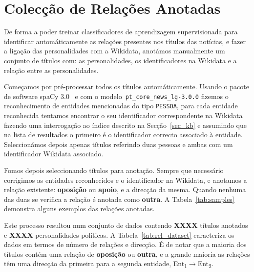 \documentclass[a4paper, twocolumn, 11pt, twoside]{article}
\begin{document}


\section{Colecção de Relações Anotadas}
\label{sec:rel_data_annot}

De forma a poder treinar classificadores de aprendizagem supervisionada para identificar automáticamente as relações presentes nos títulos das notícias, e fazer a ligação das personalidades com a Wikidata, anotámos manualmente um conjunto de títulos com: as personalidades, os identificadores na Wikidata e a relação entre as personalidades.

Começamos por pré-processar todos os títulos automáticamente. Usando o pacote de software spaCy 3.0~\citep{spacy} e com o modelo~\texttt{pt\_core\_news\_lg-3.0.0} fizemos o reconhecimento de entidades mencionadas do tipo \texttt{PESSOA}, para cada entidade reconhecida tentamos encontrar o seu identificador correspondente na Wikidata fazendo uma interrogação ao índice descrito na Secção~\ref{sec_kb} e assumindo que na lista de resultados o primeiro é o identificador correcto associado à entidade. Seleccionámos depois apenas títulos referindo duas pessoas e ambas com um identificador Wikidata associado.

Fomos depois seleccionando títulos para anotação. Sempre que necessário corrigimos as entidades reconhecidos e o identificador na Wikidata, e anotamos a relação existente: \textbf{oposição} ou \textbf{apoio}, e a direcção da mesma. Quando nenhuma das duas se verifica a relação é anotada como \textbf{outra}. A Tabela~\ref{tab:samples} demonstra alguns exemplos das relações anotadas.

Este processo resultou num conjunto de dados contendo {\bf XXXX} títulos anotados e {\bf XXXX} personalidades políticas. A Tabela~\ref{tab:rel_dataset} caracteriza os dados em termos de número de relações e direcção. É de notar que a maioria dos títulos contém uma relação de \textbf{oposição} ou \textbf{outra}, e a grande maioria as relações têm uma direcção da primeira para a segunda entidade, Ent\textsubscript{1}$\rightarrow$Ent\textsubscript{2}.
\end{document}

